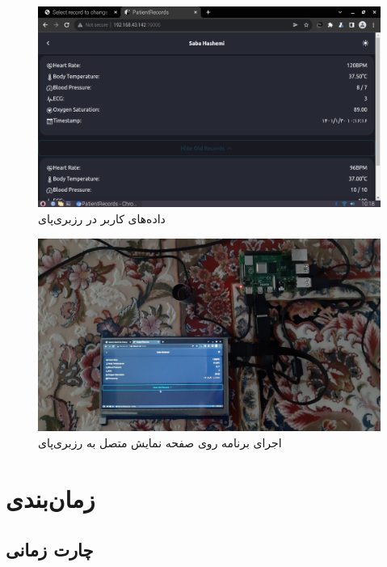 \documentclass[12pt]{article}
\begin{document}
		
		
\begin{figure}[H]
	\begin{center}
		\includegraphics[width=.55\textwidth]{images/app2.png}
	\end{center}
	\caption{ داده‌های کاربر در رزبری‌پای }
\end{figure}

		
\begin{figure}[H]
	\begin{center}
		\includegraphics[width=.55\textwidth]{images/raspberry-mobile.png}
	\end{center}
	\caption{اجرای برنامه روی صفحه نمایش متصل به رزبری‌پای}
\end{figure}



\newpage
\section{زمان‌بندی} \label{gantt}

\subsection{چارت زمانی}
\end{document}
